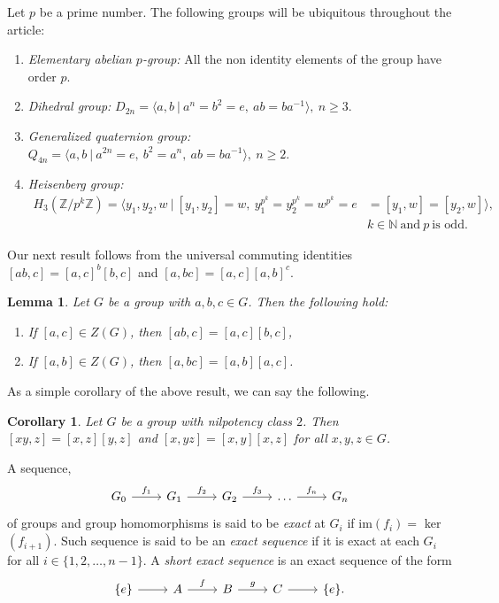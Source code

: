 \documentclass[12pt,a4paper]{article}
\newtheorem{lemma}[theorem]{Lemma}
\newtheorem{corollary}[theorem]{Corollary}
\begin{document}
Let $p$ be a prime number. The following groups will be ubiquitous throughout the article:
\begin{enumerate}[\rm (i)]\label{definition of some groups}

\item \emph{Elementary abelian $p$-group:} All the non identity elements of the group have order $p$.

\item \emph{Dihedral group:} $D_{2n} = \langle a, b ~\lvert~ a^{n} = b^2 = e, ~ ab = ba^{-1} \rangle,~n\geq 3.$

\item \emph{Generalized quaternion group:} $Q_{4n} = \langle a, b ~\lvert~ a^{2n} = e, ~ b^2 = a^n, ~ ab = ba^{-1} \rangle,~ n\geq 2.$

\item \emph{Heisenberg group:}
\\
$
\begin{aligned}
	H_3(\mathbb{Z}/p^k\mathbb{Z})=\langle y_1,y_2,w~\vert~[y_1,y_2]=w,~y_1^{p^k}=y_2^{p^k}=w^{p^k}=e&=[y_1,w]=[y_2,w]\rangle,\\
	&k\in \mathbb{N}~\text{and}~p~\text{is odd}.
\end{aligned}
$
\end{enumerate} 

Our next result follows from the universal commuting identities $[ab,c]=[a,c]^b[b,c]$ and $[a,bc]=[a,c][a,b]^c$.
\begin{lemma}\label{commutator_in_center}
 Let $G$ be a group with $a,b,c\in G$. Then the following hold:
 \begin{enumerate}[\rm (i)]
     \item If $[a,c]\in Z(G)$, then $[ab,c]=[a,c][b,c]$,
     \item If $[a,b]\in Z(G)$, then $[a,bc]=[a,b][a,c]$.
 \end{enumerate}    
\end{lemma}
As a simple corollary of the above result, we can say the following.
\begin{corollary}\label{nilpo_class_2}
Let $G$ be a group with nilpotency class $2$. Then $[xy,z]=[x,z][y,z]$ and $[x,yz]=[x,y][x,z]$ for all $x,y,z \in G$.
\end{corollary}

A sequence,  
\[
\begin{tikzcd}
  G_0 \arrow[r,"f_1"] & G_1 \arrow[r, "f_2"] & G_2 \arrow[r, "f_3"] & \dots \arrow[r, "f_n"] & G_n 
\end{tikzcd}
\]
of groups and group homomorphisms is said to be \textit{exact} at $G_i$ if im$(f_i)=$ ker$(f_{i+1})$. Such sequence is said to be an \textit{exact sequence} if it is exact at each $G_i$ for all $i\in \{1,2,\dots,n-1\}$. A \textit{short exact sequence} is an exact sequence of the form
\[
\begin{tikzcd}
  \{e\} \arrow[r] & A \arrow[r, "f"] & B \arrow[r, "g"] & C \arrow[r] & \{e\}. 
\end{tikzcd}
\]
\end{document}
